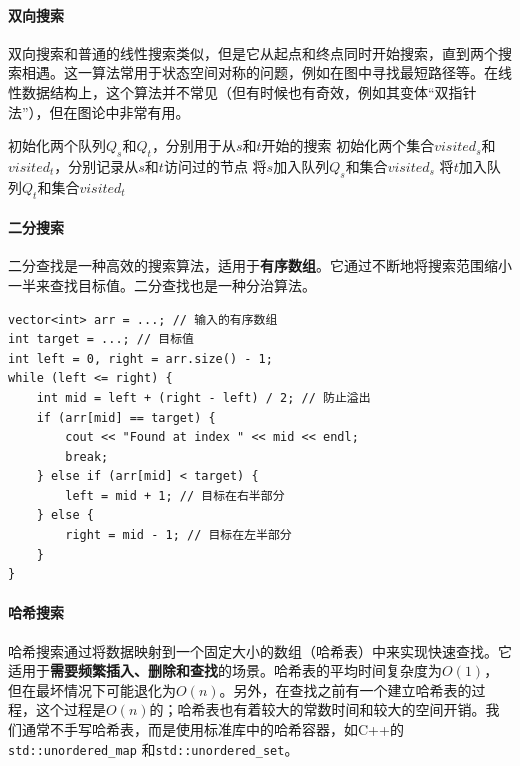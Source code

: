 \paragraph{双向搜索} 双向搜索和普通的线性搜索类似，但是它从起点和终点同时开始搜索，直到两个搜索相遇。这一算法常用于状态空间对称的问题，例如在图中寻找最短路径等。在线性数据结构上，这个算法并不常见（但有时候也有奇效，例如其变体“双指针法”），但在图论中非常有用。

\begin{algorithm}[htbp]
    \caption{双向搜索}\label{alg:bidirectional-search}
    初始化两个队列$Q_s$和$Q_t$，分别用于从$s$和$t$开始的搜索\;
    初始化两个集合$visited_s$和$visited_t$，分别记录从$s$和$t$访问过的节点\;
    将$s$加入队列$Q_s$和集合$visited_s$\;
    将$t$加入队列$Q_t$和集合$visited_t$\;
\end{algorithm}

\paragraph{二分搜索} 二分查找是一种高效的搜索算法，适用于\textbf{有序数组}。它通过不断地将搜索范围缩小一半来查找目标值。二分查找也是一种分治算法。

\begin{verbatim}
vector<int> arr = ...; // 输入的有序数组
int target = ...; // 目标值
int left = 0, right = arr.size() - 1;
while (left <= right) {
    int mid = left + (right - left) / 2; // 防止溢出
    if (arr[mid] == target) {
        cout << "Found at index " << mid << endl;
        break;
    } else if (arr[mid] < target) {
        left = mid + 1; // 目标在右半部分
    } else {
        right = mid - 1; // 目标在左半部分
    }
}
\end{verbatim}

\paragraph{哈希搜索} 哈希搜索通过将数据映射到一个固定大小的数组（哈希表）中来实现快速查找。它适用于\textbf{需要频繁插入、删除和查找}的场景。哈希表的平均时间复杂度为$O(1)$，但在最坏情况下可能退化为$O(n)$。另外，在查找之前有一个建立哈希表的过程，这个过程是$O(n)$的；哈希表也有着较大的常数时间和较大的空间开销。我们通常不手写哈希表，而是使用标准库中的哈希容器，如C++的 \texttt{std::unordered\_map} 和\texttt{std::unordered\_set}。

